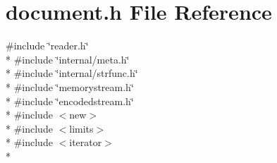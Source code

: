\hypertarget{a00473}{}\section{document.\+h File Reference}
\label{a00473}
{\ttfamily \#include \char`\"{}reader.\+h\char`\"{}}\\*
{\ttfamily \#include \char`\"{}internal/meta.\+h\char`\"{}}\\*
{\ttfamily \#include \char`\"{}internal/strfunc.\+h\char`\"{}}\\*
{\ttfamily \#include \char`\"{}memorystream.\+h\char`\"{}}\\*
{\ttfamily \#include \char`\"{}encodedstream.\+h\char`\"{}}\\*
{\ttfamily \#include $<$new$>$}\\*
{\ttfamily \#include $<$limits$>$}\\*
{\ttfamily \#include $<$iterator$>$}\\*
